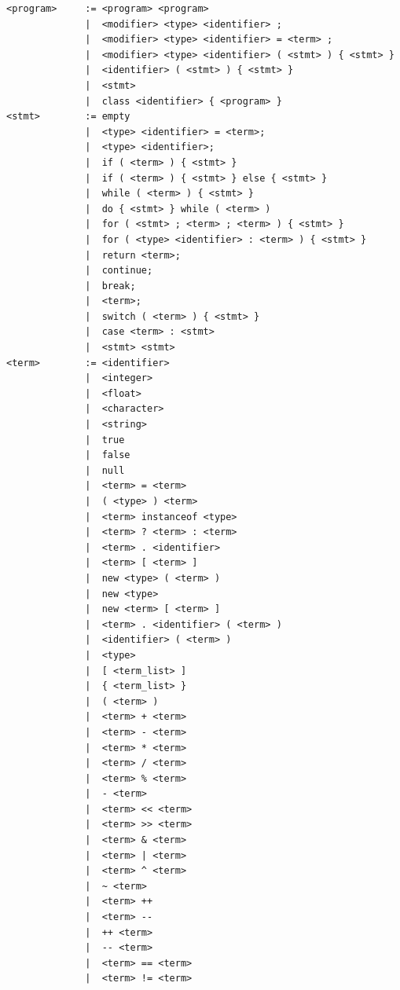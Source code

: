 \begin{tcolorbox}[
    enhanced,
    breakable,
    colback=blue!5!white,
    colframe=blue!50!black,
    title=Java Subset Language Grammar,
    fonttitle=\bfseries,
    boxrule=1pt,
    arc=3pt
]
\begin{Verbatim}[fontsize=\small]
<program>     := <program> <program>
              |  <modifier> <type> <identifier> ;
              |  <modifier> <type> <identifier> = <term> ;
              |  <modifier> <type> <identifier> ( <stmt> ) { <stmt> }
              |  <identifier> ( <stmt> ) { <stmt> }
              |  <stmt>
              |  class <identifier> { <program> }
<stmt>        := empty
              |  <type> <identifier> = <term>;
              |  <type> <identifier>;
              |  if ( <term> ) { <stmt> }
              |  if ( <term> ) { <stmt> } else { <stmt> }
              |  while ( <term> ) { <stmt> }
              |  do { <stmt> } while ( <term> )
              |  for ( <stmt> ; <term> ; <term> ) { <stmt> }
              |  for ( <type> <identifier> : <term> ) { <stmt> }
              |  return <term>;
              |  continue;
              |  break;
              |  <term>;
              |  switch ( <term> ) { <stmt> }
              |  case <term> : <stmt>
              |  <stmt> <stmt>
<term>        := <identifier>
              |  <integer>
              |  <float>
              |  <character>
              |  <string>
              |  true
              |  false
              |  null
              |  <term> = <term>
              |  ( <type> ) <term>
              |  <term> instanceof <type>
              |  <term> ? <term> : <term>
              |  <term> . <identifier>
              |  <term> [ <term> ]
              |  new <type> ( <term> )
              |  new <type>
              |  new <term> [ <term> ]
              |  <term> . <identifier> ( <term> )
              |  <identifier> ( <term> )
              |  <type>
              |  [ <term_list> ]
              |  { <term_list> }
              |  ( <term> )
              |  <term> + <term>
              |  <term> - <term>
              |  <term> * <term>
              |  <term> / <term>
              |  <term> % <term>
              |  - <term>
              |  <term> << <term>
              |  <term> >> <term>
              |  <term> & <term>
              |  <term> | <term>
              |  <term> ^ <term>
              |  ~ <term>
              |  <term> ++
              |  <term> --
              |  ++ <term>
              |  -- <term>
              |  <term> == <term>
              |  <term> != <term>

\end{Verbatim}
\end{tcolorbox}
